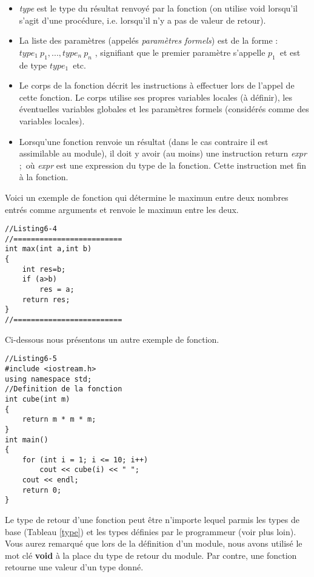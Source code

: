 \documentclass[a4paper, oneside,11pt]{book}
\begin{document}
\begin{itemize}
\item \textit{type} est le type du r\'esultat renvoy\'e par la fonction (on utilise void lorsqu'il s'agit d'une
proc\'edure, i.e. lorsqu'il n'y a pas de valeur de retour).
\item La liste des param\`etres (appel\'es \textit{param\`etres formels}) est de la forme : \textit{$type_1\ p_1 , . . . , type_n\ p_n$} ,
signifiant que le premier param\`etre s'appelle $p_1$\ et est de type $type_1$\ etc.
\item Le corps de la fonction d\'ecrit les instructions \`a effectuer lors de l'appel de cette fonction.
Le corps utilise ses propres variables locales (\`a d\'efinir), les \'eventuelles variables globales et
les param\`etres formels (consid\'er\'es comme des variables locales).
\item Lorsqu'une fonction renvoie un r\'esultat (dans le cas contraire il est assimilable au module), il doit y avoir (au moins) une instruction \og return
\textit{expr} ;\fg\ où \textit{expr} est une expression du type de la fonction. Cette instruction met fin \`a la fonction. 
\end{itemize}

Voici un exemple de fonction qui d\'etermine le maximun entre deux nombres entr\'es comme arguments et renvoie le maximun entre les deux.





\begin{lstlisting}
//Listing6-4
//=========================
int max(int a,int b)
{ 
    int res=b;
    if (a>b) 
        res = a;
    return res;
}
//=========================
\end{lstlisting}

Ci-dessous nous pr\'esentons un autre exemple de fonction.

\begin{lstlisting}
//Listing6-5
#include <iostream.h>
using namespace std;
//Definition de la fonction
int cube(int m)
{
    return m * m * m;
}
int main()
{
    for (int i = 1; i <= 10; i++)
        cout << cube(i) << " ";
    cout << endl;
    return 0;
}
\end{lstlisting}

Le  type de retour d'une fonction peut \^etre n'importe lequel parmis les types de base (Tableau \ref{type}) et les types d\'efinies par le programmeur (voir plus loin). Vous aurez remarqu\'e que lors de la d\'efinition d'un module, nous avons utilis\'e le 
mot cl\'e \textbf{void} \`a la place du type de retour du module. Par contre, 
une fonction retourne une valeur d'un type donn\'e.
\end{document}
